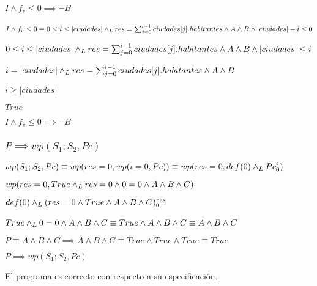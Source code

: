 \documentclass[10pt,a4paper]{article}
\begin{document}
\paragraph{$I \wedge f_{v} \leq 0 \implies \neg B$}
$I \wedge f_{v} \leq 0 \equiv 0 \leq i \leq |ciudades| \land _L res = \sum_{j=0}^{i-1} ciudades[j].habitantes \wedge A \wedge B \wedge |ciudades| - i \leq 0$ \equiv \par
\begin{center}
    $0 \leq i \leq |ciudades| \land _L res = \sum_{j=0}^{i-1} ciudades[j].habitantes \wedge A \wedge B \wedge |ciudades| \leq i$ \equiv \par
    \vspace{5px}
    $i = |ciudades| \land _L res = \sum_{j=0}^{i-1} ciudades[j].habitantes \wedge A \wedge B $ \implies \par
    \vspace{5px}
    $i \geq |ciudades|$ \equiv \par
    \vspace{5px}
    $True$ \par
    \vspace{5px}
    $I \wedge f_{v} \leq 0 \implies \neg B$
\end{center}

\subsubsection{$P \implies wp(S_{1};S_{2}, Pc)$}
$wp(S_{1};S_{2}, Pc) \equiv wp(res = 0, wp(i = 0, Pc)) \equiv wp(res = 0, def(0) \land _L Pc_{0}^{i})$ \equiv \par
\vspace{5px}
$wp(res = 0, True \land _L res = 0 \wedge 0 = 0 \wedge A \wedge B \wedge C) $ \equiv \par
\vspace{5px}
$def(0) \land _L (res = 0 \wedge True \wedge A \wedge B \wedge C)_{0}^{res} $ \equiv \par
\vspace{5px}
$True \land _L 0 = 0 \wedge A \wedge B \wedge C \equiv True \wedge A \wedge B \wedge C \equiv  A \wedge B \wedge C $ \ \par
\vspace{20px}
$P \equiv A \wedge B \wedge C \implies A \wedge B \wedge C \equiv True \wedge True \wedge True \equiv True$ \par
\vspace{5px}
\begin{center}
    $P \implies wp(S_{1};S_{2}, Pc)$
\end{center}
El programa es correcto con respecto a su especificación.
\end{document}
